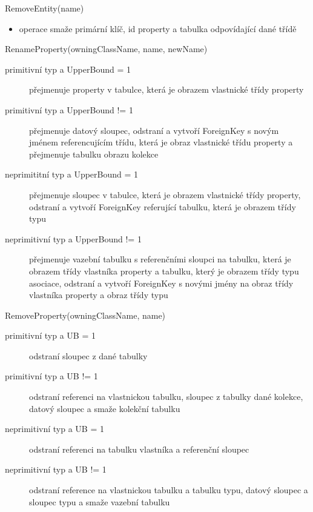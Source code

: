 \documentclass[11pt,twoside,a4paper]{book}
\begin{document}
\begin{list}{Operace :}{}
  \item RemoveEntity(name)
  \begin{itemize}
    \item operace smaže primární klíč, id property a tabulka
odpovídající dané třídě
  \end{itemize}
  
  \item RenameProperty(owningClassName, name, newName)
  \begin{description}
  \item[primitivní typ a UpperBound = 1] přejmenuje property v
  tabulce, která je obrazem vlastnické třídy property
  \item[primitivní typ a UpperBound != 1] přejmenuje datový sloupec, odstraní
  a vytvoří ForeignKey s novým jménem referencujícím třídu, která je obraz
  vlastnické třídu property a přejmenuje tabulku obrazu kolekce
  \item[neprimititní typ a UpperBound = 1] přejmenuje sloupec v
  tabulce, která je obrazem vlastnické třídy property, odstraní a vytvoří
  ForeignKey referující tabulku, která je obrazem třídy typu
  \item[neprimitivní typ a UpperBound != 1] přejmenuje vazební tabulku s
  referenčními sloupci na tabulku, která je obrazem třídy vlastníka property a
  tabulku, který je obrazem třídy typu asociace, odstraní a vytvoří ForeignKey s
  novými jmény na obraz třídy vlastníka property a obraz třídy typu
  \end{description}

  \item RemoveProperty(owningClassName, name)
  \begin{description}
  	\item[primitivní typ a UB = 1] odstraní sloupec z dané tabulky
	\item[primitivní typ a UB != 1] odstraní referenci na vlastnickou tabulku,
	sloupec z tabulky dané kolekce, datový sloupec a smaže kolekční tabulku
	\item[neprimitivní typ a UB = 1] odstraní referenci na tabulku vlastníka a
	referenční sloupec
	\item[neprimitivní typ a UB != 1] odstraní reference na vlastnickou tabulku a
	tabulku typu, datový sloupec a sloupec typu a smaže vazební tabulku
  \end{description}



\end{list}
\end{document}
